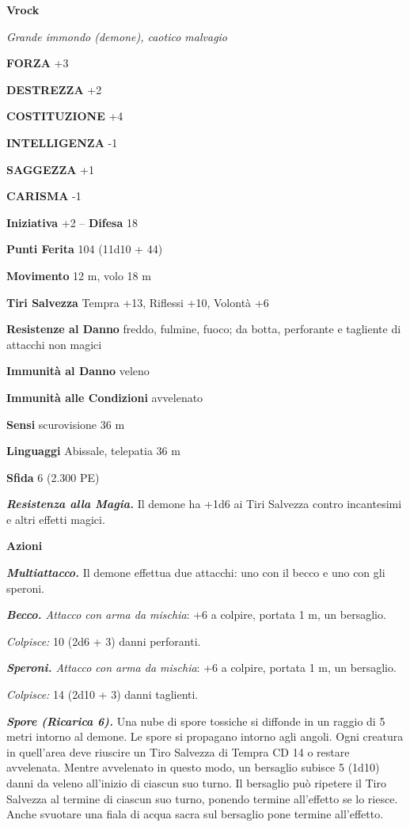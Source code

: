 \begin{multicols}{2}
\medskip{}\textbf{Vrock}

\emph{Grande immondo (demone), caotico malvagio}

\textbf{FORZA} +3

\textbf{DESTREZZA} +2

\textbf{COSTITUZIONE} +4

\textbf{INTELLIGENZA} -1

\textbf{SAGGEZZA} +1

\textbf{CARISMA} -1

\textbf{Iniziativa} +2 -- \textbf{Difesa} 18

\textbf{Punti Ferita} 104 (11d10 + 44)

\textbf{Movimento} 12 m, volo 18 m

\textbf{Tiri Salvezza} Tempra +13, Riflessi +10, Volontà +6

\textbf{Resistenze al Danno} freddo, fulmine, fuoco; da botta, perforante e tagliente di attacchi non magici

\textbf{Immunità al Danno} veleno 

\textbf{Immunità alle Condizioni} avvelenato

\textbf{Sensi} scurovisione 36 m

\textbf{Linguaggi} Abissale, telepatia 36 m

\textbf{Sfida} 6 (2.300 PE)

\emph{\textbf{Resistenza alla Magia.}} Il demone ha +1d6 ai Tiri Salvezza contro incantesimi e altri effetti magici.

\textbf{Azioni}

\emph{\textbf{Multiattacco.}} Il demone effettua due attacchi: uno con il becco e uno con gli speroni.

\emph{\textbf{Becco.} Attacco con arma da mischia}: +6 a colpire, portata 1 m, un bersaglio.

\emph{Colpisce:} 10 (2d6 + 3) danni perforanti.

\emph{\textbf{Speroni.} Attacco con arma da mischia}: +6 a colpire, portata 1 m, un bersaglio.

\emph{Colpisce:} 14 (2d10 + 3) danni taglienti.

\emph{\textbf{Spore (Ricarica 6).}} Una nube di spore tossiche si diffonde in un raggio di 5 metri intorno al demone. Le spore si propagano intorno agli angoli. Ogni creatura in quell'area deve riuscire un Tiro Salvezza di Tempra CD 14 o restare avvelenata. Mentre   avvelenato in questo modo, un bersaglio subisce 5 (1d10) danni da   veleno all'inizio di ciascun suo turno. Il bersaglio può ripetere il   Tiro Salvezza al termine di ciascun suo turno, ponendo termine   all'effetto se lo riesce. Anche svuotare una fiala di acqua sacra sul   bersaglio pone termine all'effetto.


\end{multicols}
